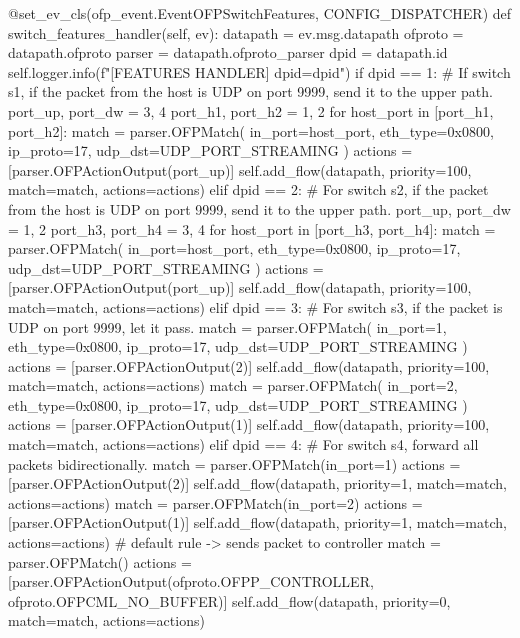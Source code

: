 \begin{pythoncode}
@set_ev_cls(ofp_event.EventOFPSwitchFeatures, CONFIG_DISPATCHER)
def switch_features_handler(self, ev):
    datapath = ev.msg.datapath
    ofproto = datapath.ofproto
    parser = datapath.ofproto_parser
    dpid = datapath.id
    self.logger.info(f"[FEATURES HANDLER] dpid={dpid}")
    if dpid == 1: # If switch s1, if the packet from the host is UDP on port 9999, send it to the upper path.
        port_up, port_dw = 3, 4 
        port_h1, port_h2 = 1, 2
        for host_port in [port_h1, port_h2]:
            match = parser.OFPMatch(
                in_port=host_port,
                eth_type=0x0800,
                ip_proto=17,
                udp_dst=UDP_PORT_STREAMING
            )
            actions = [parser.OFPActionOutput(port_up)]
            self.add_flow(datapath, priority=100, match=match, actions=actions)
    elif dpid == 2: # For switch s2, if the packet from the host is UDP on port 9999, send it to the upper path.
        port_up, port_dw = 1, 2
        port_h3, port_h4 = 3, 4
        for host_port in [port_h3, port_h4]:
            match = parser.OFPMatch(
                in_port=host_port,
                eth_type=0x0800,
                ip_proto=17,
                udp_dst=UDP_PORT_STREAMING
            )
            actions = [parser.OFPActionOutput(port_up)]
            self.add_flow(datapath, priority=100, match=match, actions=actions)
    elif dpid == 3: # For switch s3, if the packet is UDP on port 9999, let it pass.
        match = parser.OFPMatch(
            in_port=1, eth_type=0x0800, ip_proto=17, udp_dst=UDP_PORT_STREAMING
        )
        actions = [parser.OFPActionOutput(2)]
        self.add_flow(datapath, priority=100, match=match, actions=actions)
        match = parser.OFPMatch(
            in_port=2, eth_type=0x0800, ip_proto=17, udp_dst=UDP_PORT_STREAMING
        )
        actions = [parser.OFPActionOutput(1)]
        self.add_flow(datapath, priority=100, match=match, actions=actions)
    elif dpid == 4: # For switch s4, forward all packets bidirectionally.
        match = parser.OFPMatch(in_port=1)
        actions = [parser.OFPActionOutput(2)]
        self.add_flow(datapath, priority=1, match=match, actions=actions)
        match = parser.OFPMatch(in_port=2)
        actions = [parser.OFPActionOutput(1)]
        self.add_flow(datapath, priority=1, match=match, actions=actions)
    # default rule -> sends packet to controller
    match = parser.OFPMatch()
    actions = [parser.OFPActionOutput(ofproto.OFPP_CONTROLLER,
                                    ofproto.OFPCML_NO_BUFFER)]
    self.add_flow(datapath, priority=0, match=match, actions=actions)
\end{pythoncode}
\newpage



